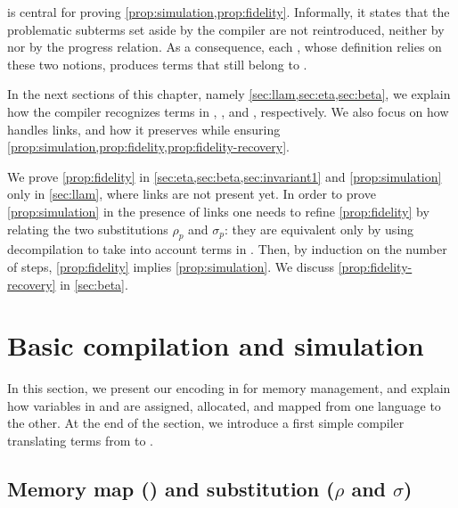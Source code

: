 \noindent
{} is central for proving
\cref{prop:simulation,prop:fidelity}. Informally, it states that the
problematic subterms set aside by the compiler are not reintroduced,
neither by \Ue nor by the progress relation. As a consequence, each
\hstep, whose definition relies on these two notions, produces terms that
still belong to \wellb.

In the next sections of this chapter, namely
\cref{sec:llam,sec:eta,sec:beta}, we explain how the compiler
recognizes terms in \maybebeta, \maybeeta, and \notllambda,
respectively. We also focus on how \progress handles links, and how it
preserves \wellb while ensuring
\cref{prop:simulation,prop:fidelity,prop:fidelity-recovery}.

We prove \cref{prop:fidelity} in
\cref{sec:eta,sec:beta,sec:invariant1}
and \cref{prop:simulation} only in \cref{sec:llam},
where links are not present yet.
In order to prove \cref{prop:simulation} in the presence of links
one needs to refine \cref{prop:fidelity} by relating the two
substitutions $\rho_p$ and $\sigma_p$: they are equivalent only by using decompilation to 
take into account terms in \linkStore.
Then, by induction
on the number of steps, \cref{prop:fidelity} implies \cref{prop:simulation}.
We discuss \cref{prop:fidelity-recovery} in \cref{sec:beta}.


\section{Basic compilation and simulation}
\label{sec:simulation}

In this section, we present our encoding in \elpi for memory
management, and explain how variables in \Fo and \Ho are assigned,
allocated, and mapped from one language to the other. At the end of the
section, we introduce a first simple compiler translating terms from
\Fo to \Ho.

\subsection{Memory map (\mapStore) and substitution (\texorpdfstring{$\rho$ and $\sigma$}{rho and sigma})}
\label{sec:grounwork}


